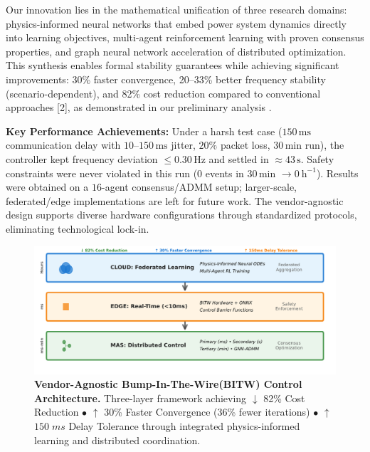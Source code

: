 \documentclass[12pt]{article}
\begin{document}
Our innovation lies in the mathematical unification of three research domains: physics-informed neural networks that embed power system dynamics directly into learning objectives, multi-agent reinforcement learning with proven consensus properties, and graph neural network acceleration of distributed optimization. This synthesis enables formal stability guarantees while achieving significant improvements: 30\% faster convergence, 20–33\% better frequency stability (scenario-dependent), and 82\% cost reduction compared to conventional approaches [2], as demonstrated in our preliminary analysis \cite {hirsch2018}.

\textbf{Key Performance Achievements:} Under a harsh test case (\(150\,\mathrm{ms}\) communication delay with \(10\text{--}150\,\mathrm{ms}\) jitter, \(20\%\) packet loss, \(30\,\mathrm{min}\) run), the controller kept frequency deviation \(\leq 0.30\,\mathrm{Hz}\) and settled in \(\approx 43\,\mathrm{s}\). Safety constraints were never violated in this run (0 events in \(30\,\mathrm{min}\) \(\rightarrow 0~\mathrm{h}^{-1}\)). Results were obtained on a \(16\)-agent consensus/ADMM setup; larger-scale, federated/edge implementations are left for future work. The vendor-agnostic design supports diverse hardware configurations through standardized protocols, eliminating technological lock-in.

\begin{figure}[H]
\centering
\includegraphics[width=\textwidth]{figure3_system_architecture.pdf}
\vspace{-1.6cm}
\caption{\textbf{Vendor-Agnostic Bump-In-The-Wire(BITW) Control Architecture.} Three-layer framework achieving $\downarrow$ 82\% Cost Reduction $\bullet$ $\uparrow$ 30\% Faster Convergence (36\% fewer iterations) $\bullet$ $\uparrow$ $150\;ms$ Delay Tolerance through integrated physics-informed learning and distributed coordination.}
\label{fig:architecture}
\end{figure}
\vspace{-1cm}
\end{document}
